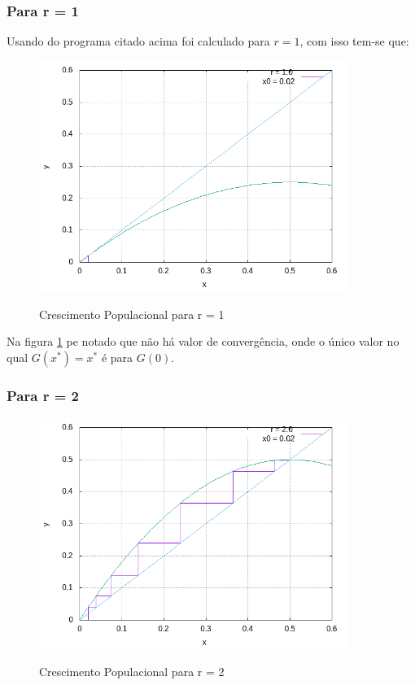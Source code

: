\documentclass[a4paper, 12pt]{article}
\begin{document}
\hspace{0.5cm}

\subsubsection{Para r = 1}

	Usando do programa citado acima foi calculado para $ r = 1$, com isso tem-se que:
	
\begin{figure}[H]
	\centering
	\caption{Crescimento Populacional para r = 1}{}
	\includegraphics[width=10.0cm]{r=1_0__x0=0_02.png}
	\label{fig:img1}
\end{figure}

Na figura \ref{fig:img1} pe notado que não há valor de convergência, onde o único valor no qual $G(x^{*}) = x^{*}$ é para $G(0)$. 

\hspace{0.5cm}

\subsubsection{Para r = 2}
\begin{figure}[H]
	\centering
	\caption{Crescimento Populacional para r = 2}{}
	\includegraphics[width=10.0cm]{r=2_0__x0=0_02.png}
	\label{fig:img2}
\end{figure}
\end{document}
